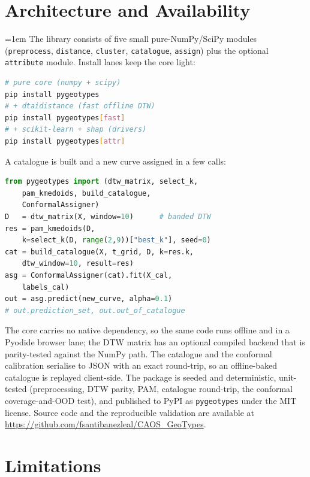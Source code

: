 \documentclass[journal]{IEEEtran}
\begin{document}
\section{Architecture and Availability}\label{sec:arch}

{\raggedright\parindent=1em
The library consists of five small pure-NumPy/SciPy modules (\texttt{preprocess}, \texttt{distance},
\texttt{cluster}, \texttt{catalogue}, \texttt{assign}) plus the optional \texttt{attribute} module. Install lanes
keep the core light:\par}

\begin{lstlisting}[language=bash]
# pure core (numpy + scipy)
pip install pygeotypes
# + dtaidistance (fast offline DTW)
pip install pygeotypes[fast]
# + scikit-learn + shap (drivers)
pip install pygeotypes[attr]
\end{lstlisting}

A catalogue is built and a new curve assigned in a few calls:

\begin{lstlisting}[language=Python]
from pygeotypes import (dtw_matrix, select_k,
    pam_kmedoids, build_catalogue,
    ConformalAssigner)
D   = dtw_matrix(X, window=10)      # banded DTW
res = pam_kmedoids(D,
    k=select_k(D, range(2,9))["best_k"], seed=0)
cat = build_catalogue(X, t_grid, D, k=res.k,
    dtw_window=10, result=res)
asg = ConformalAssigner(cat).fit(X_cal,
    labels_cal)
out = asg.predict(new_curve, alpha=0.1)
# out.prediction_set, out.out_of_catalogue
\end{lstlisting}

The core carries no native dependency, so the same code runs offline and in a Pyodide browser lane; the DTW
matrix has an optional compiled backend that is parity-tested against the NumPy path. The catalogue and the
conformal calibration serialise to JSON with an exact round-trip, so an offline-baked catalogue is replayed
client-side. The package is seeded and deterministic, unit-tested (preprocessing, DTW parity, PAM, catalogue
round-trip, the conformal coverage-and-OOD test), and published to PyPI as \texttt{pygeotypes} under the MIT
license. Source code and the reproducible validation are available at
\url{https://github.com/fsantibanezleal/CAOS_GeoTypes}.

\section{Limitations}\label{sec:limits}
\end{document}

